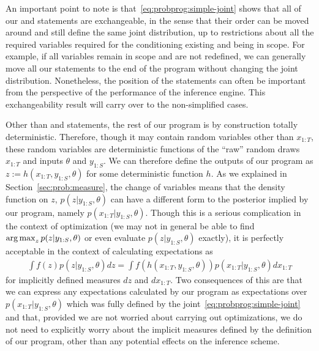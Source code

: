 An important point to note is that~\eqref{eq:probprog:simple-joint} shows that all of our \sample
and \observe statements are exchangeable, in the sense that their order can be moved around and
still define the same joint distribution, up to restrictions about all the required variables required
for the conditioning existing and being in scope.  For example, if all variables remain in scope
and are not redefined, we can generally move all our \observe statements to the end of the program
without changing the joint distribution.  Nonetheless, the position of the \observe statements
can often be important from the perspective of the performance of the inference engine.  This exchangeability
result will carry over to the non-simplified cases.

Other than \sample and \observe statements, the rest of our program is by construction totally deterministic.  Therefore,
though it may contain random variables other than $x_{1:T}$, these random variables are deterministic
functions of the ``raw'' random draws $x_{1:T}$ and inputs $\theta$ and $y_{1:S}$.  We can therefore 
define the outputs of our program as $z := h(x_{1:T},y_{1:S},\theta)$ for some deterministic function $h$.
As we explained in Section~\ref{sec:prob:measure}, the change of variables means that the density function on $z$,
$p(z | y_{1:S}, \theta) $
can have a different form to the posterior implied by our program, namely $p(x_{1:T} | y_{1:S}, \theta)$.
  Though this is a serious complication in the
context of optimization (we may not in general be able to find $\operatorname*{arg\,max}_z p(z|y_{1:S},\theta)$
or even evaluate $p(z | y_{1:S}, \theta)$ exactly), it
is perfectly acceptable in the context of calculating expectations as
\begin{align}
\int f(z) p(z | y_{1:S}, \theta) dz = \int f(h(x_{1:T}, y_{1:S}, \theta)) p(x_{1:T} | y_{1:S}, \theta) dx_{1:T}
\end{align}
for implicitly defined measures $dz$ and $dx_{1:T}$.  Two consequences of this are that
we can express any expectations calculated by our program as expectations over $p(x_{1:T} | y_{1:S}, \theta)$
which was fully defined by the joint~\eqref{eq:probprog:simple-joint} and that, provided we are not worried
about carrying out optimizations, we do not need to explicitly worry about the implicit measures defined
by the definition of our program, other than any potential effects on the inference scheme.


%
%

